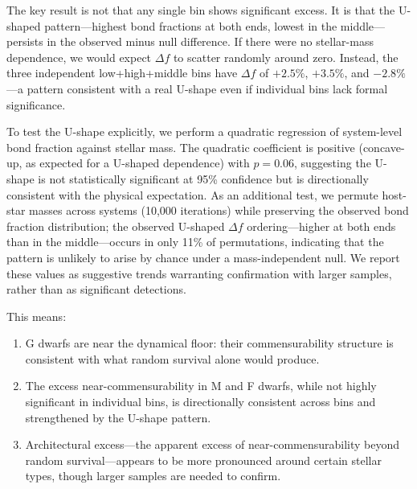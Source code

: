 \documentclass[twocolumn,usenatbib]{mnras}
\begin{document}
The key result is not that any single bin shows significant excess. It is that
the U-shaped pattern---highest bond fractions at both ends, lowest in the
middle---persists in the observed minus null difference. If there were no
stellar-mass dependence, we would expect $\Delta f$ to scatter randomly around
zero. Instead, the three independent low+high+middle bins have $\Delta f$ of
$+2.5\%$, $+3.5\%$, and $-2.8\%$---a pattern consistent with a real U-shape
even if individual bins lack formal significance.

To test the U-shape explicitly, we perform a quadratic regression of
system-level bond fraction against stellar mass. The quadratic coefficient is
positive (concave-up, as expected for a U-shaped dependence) with $p = 0.06$,
suggesting the U-shape is not statistically significant at 95\% confidence but
is directionally consistent with the physical expectation. As an additional test, we permute host-star
masses across systems (10,000 iterations) while preserving the observed bond
fraction distribution; the observed U-shaped $\Delta f$ ordering---higher at
both ends than in the middle---occurs in only 11\% of permutations,
indicating that the pattern is unlikely to arise by chance under a
mass-independent null. We report these values as suggestive trends warranting
confirmation with larger samples, rather than as significant detections.

This means:
\begin{enumerate}
  \item G dwarfs are near the dynamical floor: their commensurability
        structure is consistent with what random survival alone would produce.
  \item The excess near-commensurability in M and F dwarfs, while not highly
        significant in individual bins, is directionally consistent across bins
        and strengthened by the U-shape pattern.
  \item Architectural excess---the apparent excess of near-commensurability
        beyond random survival---appears to be more pronounced around
        certain stellar types, though larger samples are needed to confirm.
\end{enumerate}
\end{document}

